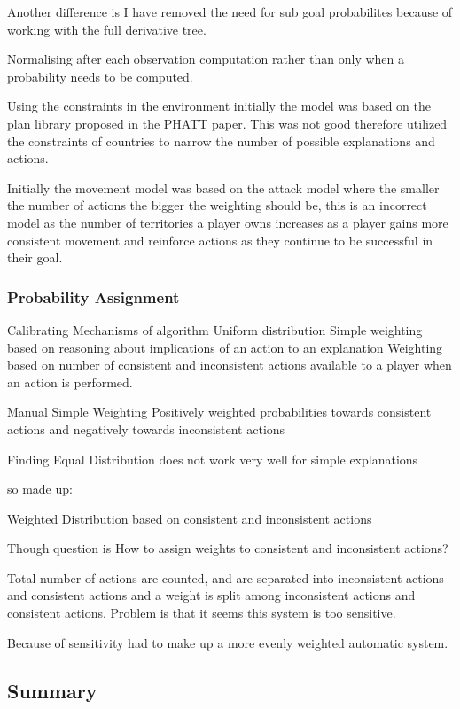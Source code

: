 \documentclass[parskip]{cs4rep}
\begin{document}
Another difference is I have removed the need for sub goal probabilites because of working with the full derivative tree.

Normalising after each observation computation rather than only when a probability needs to be computed.

Using the constraints in the environment initially the model was based on the plan library proposed in the PHATT paper. This was not good therefore utilized the constraints of countries to narrow the number of possible explanations and actions.

Initially the movement model was based on the attack model where the smaller the number of actions the bigger the weighting should be, this is an incorrect model as the number of territories a player owns increases as a player gains more consistent movement and reinforce actions as they continue to be successful in their goal.

\subsubsection{Probability Assignment}

Calibrating Mechanisms of algorithm
Uniform distribution
Simple weighting based on reasoning about implications of an action to an explanation
Weighting based on number of consistent and inconsistent actions available to a player when an action is performed.

Manual Simple Weighting
Positively weighted probabilities towards consistent actions and negatively towards inconsistent actions

Finding
Equal Distribution does not work very well for simple explanations

so made up:

Weighted Distribution based on consistent and inconsistent actions

Though question is How to assign weights to consistent and inconsistent actions?

Total number of actions are counted, and are separated into inconsistent actions and consistent actions and a weight is split among inconsistent actions and consistent actions. Problem is that it seems this system is too sensitive.

Because of sensitivity had to make up a more evenly weighted automatic system.

\subsection{Summary}
\end{document}
